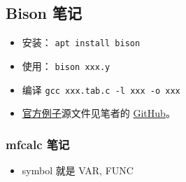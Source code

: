 \subsection{Bison 笔记}
\begin{itemize}
\item 安装： \verb`apt install bison`
\item 使用： \verb`bison xxx.y`
\item 编译 \verb`gcc xxx.tab.c -l xxx -o xxx`
\item \href{http://web.mit.edu/gnu/doc/html/bison_5.html}{官方例子}源文件见笔者的 \href{https://github.com/MacroUniverse/bison_test}{GitHub}。
\end{itemize}

\subsubsection{mfcalc 笔记}
\begin{itemize}
\item symbol 就是 VAR, FUNC
\end{itemize}
